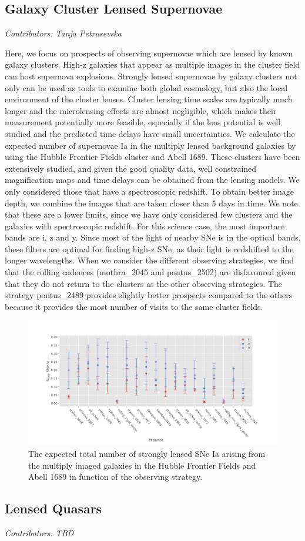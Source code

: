 \subsection{Galaxy Cluster Lensed Supernovae}
\textit{Contributors: Tanja Petrusevska}

Here, we focus on prospects of observing supernovae which are
lensed by known galaxy clusters. High-z galaxies that appear as
multiple images in the cluster field can host supernova
explosions. Strongly lensed supernovae by galaxy clusters not only
can be used as tools to examine both global cosmology, but also
the local environment of the cluster lenses. Cluster lensing time
scales are typically much longer and the microlensing effects are
almost negligible, which makes their measurement potentially more
feasible, especially if the lens potential is well studied and the
predicted time delays have small uncertainties. We calculate the
expected number of supernovae Ia in the multiply lensed background
galaxies by using the Hubble Frontier Fields cluster and Abell
1689. These clusters have been extensively studied, and given the
good quality data, well constrained magnification maps and time
delays can be obtained from the lensing models. We only considered
those that have a spectroscopic redshift. To obtain better image
depth, we combine the images that are taken closer than 5 days in
time. We note that these are a lower limits, since we have only
considered few clusters and the galaxies with spectroscopic
redshift. For this science case, the most important bands are i, z
and y. Since most of the light of nearby SNe is in the optical
bands, these filters are optimal for finding high-z SNe, as their
light is redshifted to the longer wavelengths. When we consider
the different observing strategies, we find that the rolling
cadences (mothra\_2045 and pontus\_2502) are disfavoured given that
they do not return to the clusters as the other observing
strategies. The strategy pontus\_2489 provides slightly better
prospects compared to the others because it provides the most
number of visits to the same cluster fields.

\begin{figure}
\centering
\includegraphics[scale=0.65]{figures/galaxy_lensing.pdf}\caption{The expected total number of strongly lensed SNe Ia arising from the multiply imaged galaxies in the Hubble Frontier Fields and Abell 1689 in function of the observing strategy. }
\end{figure}

\FloatBarrier
\subsection{Lensed Quasars}
\textit{Contributors: TBD}

